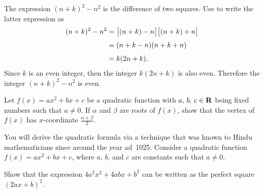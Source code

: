 \documentclass[a4paper,oneside,12pt]{article}
\begin{document}
\begin{problem}
{\begin{solution}
The expression $(n + k)^2 - n^2$ is the difference of two squares.
Use
to write the latter expression as
\begin{align*}
(n + k)^2 - n^2
&=
\big[(n + k) - n\big]
\big[(n + k) + n\big] \\[4pt]
&=
(n + k - n) (n + k + n) \\[4pt]
&=
k (2n + k).
\end{align*}
Since $k$ is an even integer, then the integer $k (2n + k)$ is also
even.  Therefore the integer $(n + k)^2 - n^2$ is even.
\end{solution}
}{}

\item Let $f(x) = ax^2 + bx + c$ be a quadratic function with
  ${a},\, {b},\, {c} \in \mathbf{R}$ being fixed numbers such that
  $a \neq 0$.  If $\alpha$ and $\beta$ are roots of $f(x)$, show that
  the vertex of $f(x)$ has $x$-coordinate $\frac{\alpha + \beta}{2}$.

\item You will derive the quadratic formula via a technique that was
  known to Hindu mathematicians since around the year {\sc ad}~1025.
  Consider a quadratic function $f(x) = ax^2 + bx + c$, where $a$,
  $b$, and $c$ are constants such that $a \neq 0$.
  \begin{packedenum}
  \item\label{subprob:quadroots:quadratic_roots:formula_Hindu_perfect_square}
    Show that the expression $4a^2x^2 + 4abx + b^2$ can be written as
    the perfect square $(2ax + b)^2$.


\end{packedenum}
\end{problem}
\end{document}
